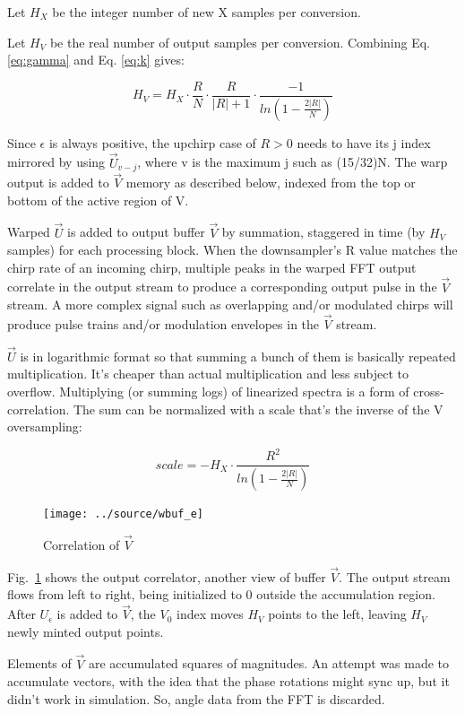 Let $H_X$ be the integer number of new X samples per conversion.

Let $H_V$ be the real number of output samples per conversion.
Combining Eq. \ref{eq:gamma} and Eq. \ref{eq:k} gives:

\begin{equation}  \label{eq:hv}
H_V = H_X \cdot \frac{R}{N} \cdot \frac{R}{|R| + 1}
          \cdot \frac{-1}{ln(1 - \frac{2|R|}{N})}
\end{equation}

Since $\epsilon$ is always positive, the upchirp case of $R>0$ needs to have its
j index mirrored by using $\vec{U}_{v-j}$, where v is the maximum j such as (15/32)N.
The warp output is added to $\vec{V}$ memory as described below, indexed from the
top or bottom of the active region of V.

Warped $\vec{U}$ is added to output buffer $\vec{V}$ by summation,
staggered in time (by $H_V$ samples) for each processing block.
When the downsampler's R value matches the chirp rate of an incoming chirp,
multiple peaks in the warped FFT output correlate in the output stream to
produce a corresponding output pulse in the $\vec{V}$ stream.
A more complex signal such as overlapping and/or modulated chirps will produce
pulse trains and/or modulation envelopes in the $\vec{V}$ stream.

$\vec{U}$ is in logarithmic format so that summing a bunch of them is basically 
repeated multiplication.
It's cheaper than actual multiplication and less subject to overflow.
Multiplying (or summing logs) of linearized spectra is a form of cross-correlation.
The sum can be normalized with a scale that's the inverse of the V oversampling:

\begin{equation}
scale = -H_X \cdot \frac{R^2}{ln(1 - \frac{2|R|}{N})}
\end{equation} %

\begin{figure}
    \centering
    \texttt{[image: ../source/wbuf\_e]}
    \caption[$\vec{V}$ correlation]{Correlation of $\vec{V}$}
    \label{fig:wbuf}
\end{figure}

Fig.~\ref{fig:wbuf} shows the output correlator, another view of buffer $\vec{V}$.
The output stream flows from left to right,
being initialized to 0 outside the accumulation region.
After $U_\epsilon$ is added to $\vec{V}$, the $V_0$ index moves $H_V$ points
to the left, leaving $H_V$ newly minted output points.

Elements of $\vec{V}$ are accumulated squares of magnitudes.
An attempt was made to accumulate vectors,
with the idea that the phase rotations might sync up,
but it didn't work in simulation.
So, angle data from the FFT is discarded.

